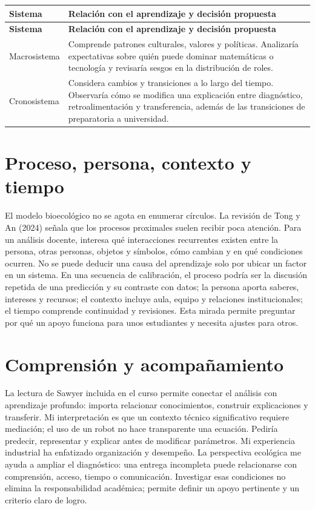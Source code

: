 \documentclass[spanish,letterpaper,oneside]{article}
\begin{document}
{\small{}\renewcommand{\arraystretch}{1.25}
\begin{longtable}{|>{\raggedright\arraybackslash}p{}|>{\raggedright\arraybackslash}p{}|}\hline
\rowcolor{iiiepePale} \textbf{Sistema} & \textbf{Relación con el aprendizaje y decisión propuesta} \\\hline
\endfirsthead
\hline
\rowcolor{iiiepePale} \textbf{Sistema} & \textbf{Relación con el aprendizaje y decisión propuesta} \\\hline
\endhead
Macrosistema & Comprende patrones culturales, valores y políticas. Analizaría expectativas sobre quién puede dominar matemáticas o tecnología y revisaría sesgos en la distribución de roles. \\\hline
Cronosistema & Considera cambios y transiciones a lo largo del tiempo. Observaría cómo se modifica una explicación entre diagnóstico, retroalimentación y transferencia, además de las transiciones de preparatoria a universidad. \\\hline
\end{longtable}}


\section{Proceso, persona, contexto y tiempo}
El modelo bioecológico no se agota en enumerar círculos. La revisión de Tong y An (2024) señala que los procesos proximales suelen recibir poca atención. Para un análisis docente, interesa qué interacciones recurrentes existen entre la persona, otras personas, objetos y símbolos, cómo cambian y en qué condiciones ocurren. No se puede deducir una causa del aprendizaje solo por ubicar un factor en un sistema.
En una secuencia de calibración, el proceso podría ser la discusión repetida de una predicción y su contraste con datos; la persona aporta saberes, intereses y recursos; el contexto incluye aula, equipo y relaciones institucionales; el tiempo comprende continuidad y revisiones. Esta mirada permite preguntar por qué un apoyo funciona para unos estudiantes y necesita ajustes para otros.
\section{Comprensión y acompañamiento}
La lectura de Sawyer incluida en el curso permite conectar el análisis con aprendizaje profundo: importa relacionar conocimientos, construir explicaciones y transferir. Mi interpretación es que un contexto técnico significativo requiere mediación; el uso de un robot no hace transparente una ecuación. Pediría predecir, representar y explicar antes de modificar parámetros.
Mi experiencia industrial ha enfatizado organización y desempeño. La perspectiva ecológica me ayuda a ampliar el diagnóstico: una entrega incompleta puede relacionarse con comprensión, acceso, tiempo o comunicación. Investigar esas condiciones no elimina la responsabilidad académica; permite definir un apoyo pertinente y un criterio claro de logro.
\end{document}
